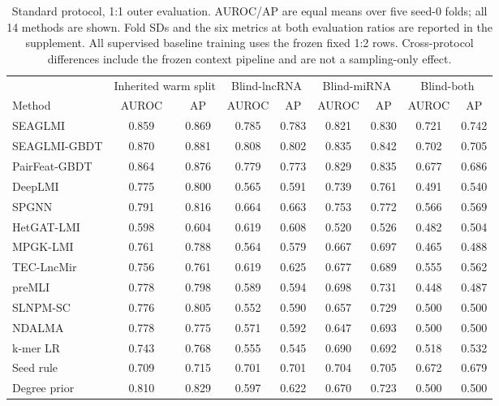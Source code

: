 \begin{table}[t]
\centering
\caption{Standard protocol, 1:1 outer evaluation. AUROC/AP are equal means over five seed-0 folds; all 14 methods are shown. Fold SDs and the six metrics at both evaluation ratios are reported in the supplement. All supervised baseline training uses the frozen fixed 1:2 rows. Cross-protocol differences include the frozen context pipeline and are not a sampling-only effect.}
\label{tab:standard}
\scriptsize
\setlength{\tabcolsep}{3pt}
\begin{tabular}{lcccccccc}
\toprule
 & \multicolumn{2}{c}{Inherited warm split} & \multicolumn{2}{c}{Blind-lncRNA} & \multicolumn{2}{c}{Blind-miRNA} & \multicolumn{2}{c}{Blind-both} \\
\cmidrule(lr){2-3}\cmidrule(lr){4-5}\cmidrule(lr){6-7}\cmidrule(lr){8-9}
Method & AUROC & AP & AUROC & AP & AUROC & AP & AUROC & AP \\
\midrule
SEAGLMI & 0.859 & 0.869 & 0.785 & 0.783 & 0.821 & 0.830 & 0.721 & 0.742 \\
SEAGLMI-GBDT & 0.870 & 0.881 & 0.808 & 0.802 & 0.835 & 0.842 & 0.702 & 0.705 \\
PairFeat-GBDT & 0.864 & 0.876 & 0.779 & 0.773 & 0.829 & 0.835 & 0.677 & 0.686 \\
DeepLMI & 0.775 & 0.800 & 0.565 & 0.591 & 0.739 & 0.761 & 0.491 & 0.540 \\
SPGNN & 0.791 & 0.816 & 0.664 & 0.663 & 0.753 & 0.772 & 0.566 & 0.569 \\
HetGAT-LMI & 0.598 & 0.604 & 0.619 & 0.608 & 0.520 & 0.526 & 0.482 & 0.504 \\
MPGK-LMI & 0.761 & 0.788 & 0.564 & 0.579 & 0.667 & 0.697 & 0.465 & 0.488 \\
TEC-LncMir & 0.756 & 0.761 & 0.619 & 0.625 & 0.677 & 0.689 & 0.555 & 0.562 \\
preMLI & 0.778 & 0.798 & 0.589 & 0.594 & 0.698 & 0.731 & 0.448 & 0.487 \\
SLNPM-SC & 0.776 & 0.805 & 0.552 & 0.590 & 0.657 & 0.729 & 0.500 & 0.500 \\
NDALMA & 0.778 & 0.775 & 0.571 & 0.592 & 0.647 & 0.693 & 0.500 & 0.500 \\
k-mer LR & 0.743 & 0.768 & 0.555 & 0.545 & 0.690 & 0.692 & 0.518 & 0.532 \\
Seed rule & 0.709 & 0.715 & 0.701 & 0.701 & 0.704 & 0.705 & 0.672 & 0.679 \\
Degree prior & 0.810 & 0.829 & 0.597 & 0.622 & 0.670 & 0.723 & 0.500 & 0.500 \\
\bottomrule
\end{tabular}
\end{table}
